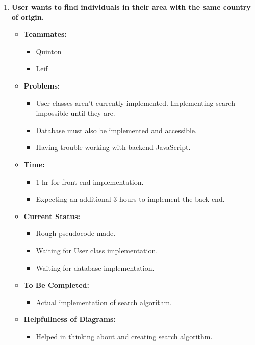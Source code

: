 \documentclass[12pt]{article}
\begin{document}
\begin{enumerate}
    \item \textbf{User wants to find individuals in their area with the same country of origin.}
      \begin{itemize}
        \item \textbf{Teammates:}
          \begin{itemize}
            \item Quinton
            \item Leif
          \end{itemize}
        \item \textbf{Problems:}
          \begin{itemize}
            \item User classes aren’t currently implemented. Implementing search impossible until they are.
            \item Database must also be implemented and accessible.
            \item Having trouble working with backend JavaScript.
          \end{itemize}
        \item \textbf{Time:}
          \begin{itemize}
            \item 1 hr for front-end implementation.
            \item Expecting an additional 3 hours to implement the back end.
          \end{itemize}
        \item \textbf{Current Status:}
          \begin{itemize}
            \item Rough pseudocode made.
            \item Waiting for User class implementation.
            \item Waiting for database implementation.
          \end{itemize}
        \item \textbf{To Be Completed:}
          \begin{itemize}
            \item Actual implementation of search algorithm.
          \end{itemize}
        \item \textbf{Helpfullness of Diagrams:}
          \begin{itemize}
            \item Helped in thinking about and creating search algorithm.
          \end{itemize}
      \end{itemize}
  

\end{enumerate}
\end{document}
